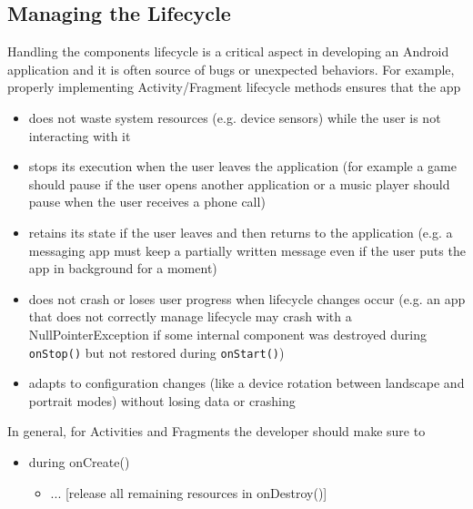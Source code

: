 \documentclass[11pt,a4paper,notitlepage]{article}
\begin{document}
\subsection{Managing the Lifecycle}
Handling the components lifecycle is a critical aspect in developing an Android application and it is often source of bugs or unexpected behaviors. For example, properly implementing Activity/Fragment lifecycle methods ensures that the app
\begin{itemize}
	\item does not waste system resources (e.g. device sensors) while the user is not interacting with it
	\item stops its execution when the user leaves the application (for example a game should pause if the user opens another application or a music player should pause when the user receives a phone call)
	\item retains its state if the user leaves and then returns to the application (e.g. a messaging app must keep a partially written message even if the user puts the app in background for a moment)
	\item does not crash or loses user progress when lifecycle changes occur (e.g. an app that does not correctly manage lifecycle may crash with a NullPointerException if some internal component was destroyed during \texttt{onStop()} but not restored during \texttt{onStart()})
	\item adapts to configuration changes (like a device rotation between landscape and portrait modes) without losing data or crashing
\end{itemize}
In general, for Activities and Fragments the developer should make sure to
\begin{itemize}
	\item during onCreate()
	\begin{itemize}
		\item ... [release all remaining resources in onDestroy()]
	\end{itemize}
\end{itemize}
\end{document}
